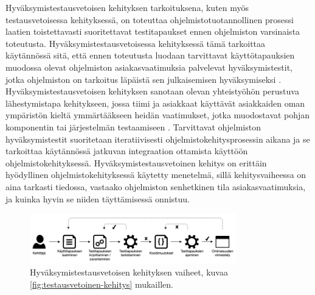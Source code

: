   Hyväksymistestausvetoisen kehityksen tarkoituksena, kuten myös testausvetoisessa kehityksessä, on toteuttaa ohjelmistotuotannollinen prosessi laatien toistettavasti suoritettavat testitapaukset ennen ohjelmiston varsinaista toteutusta.
  Hyväksymistestausvetoisessa kehityksessä tämä tarkoittaa käytännössä sitä, että ennen toteutusta luodaan tarvittavat käyttötapauksien muodossa olevat ohjelmiston asiakasvaatimuksia palvelevat hyväksymistestit, jotka ohjelmiston on tarkoitus läpäistä sen julkaisemisen hyväksymiseksi \cite[s.~324]{test_driven_book}.
  Hyväksymistestausvetoisen kehityksen sanotaan olevan yhteistyöhön perustuva lähestymistapa kehitykseen, jossa tiimi ja asiakkaat käyttävät asiakkaiden oman ympäristön kieltä ymmärtääkseen heidän vaatimukset, jotka muodostavat pohjan komponentin tai järjestelmän testaamiseen \cite{istqb_glossary_v3_3}.
  Tarvittavat ohjelmiston hyväksymistestit suoritetaan iteratiivisesti ohjelmistokehitysprosessin aikana ja se tarkoittaa käytännössä jatkuvan integraation ottamista käyttöön ohjelmistokehityksessä.
  Hyväksymistestausvetoinen kehitys on erittäin hyödyllinen ohjelmistokehityksessä käytetty menetelmä, sillä kehitysvaiheessa on aina tarkasti tiedossa, vastaako ohjelmiston senhetkinen tila asiakasvaatimuksia, ja kuinka hyvin se niiden täyttämisessä onnistuu.

  \begin{figure}[H]
    \centering
    \includegraphics[width=0.8\textwidth]{assets/hyvaksymistestausvetoinen-kehitys.png}
    \caption{Hyväksymistestausvetoisen kehityksen vaiheet, kuvaa \ref{fig:testausvetoinen-kehitys} mukaillen.}
    \label{fig:hyvaksymistestausvetoinen-kehitys}
  \end{figure}

